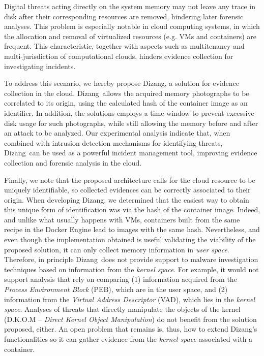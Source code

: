 \documentclass[twocolumn, notitlepage]{bmcart}%
\newcommand{\fancyname}{Dizang}
\begin{document}
Digital threats acting directly on the system memory may not leave any trace in disk after their corresponding resources are removed, hindering later forensic analyses.
%
This problem is especially notable in cloud computing systems, in which the allocation and removal of virtualized resources (e.g. VMs and containers) are frequent.
%
This characteristic, together with aspects such as multitenancy and multi-jurisdiction of computational clouds, hinders evidence collection for investigating incidents.


To address this scenario, we hereby propose \fancyname, a solution for evidence collection in the cloud.
%
\fancyname\ allows the acquired memory photographs to be correlated to its origin, using the calculated hash of the container image as an identifier.
%
In addition, the solutions employs a time window to prevent excessive disk usage for such photographs, while still allowing the memory before and after an attack to be analyzed.
%
Our experimental analysis indicate that, when combined with intrusion detection mechanisms for identifying threats, \fancyname\ can be used as a powerful incident management tool, improving evidence collection and forensic analysis in the cloud.
%


Finally, we note that the proposed architecture calls for the cloud resource to be uniquely identifiable, so collected evidences can be correctly associated to their origin.
%
When developing \fancyname, we determined that the easiest way to obtain this unique form of identification was via the hash of the container image.
%
Indeed, and unlike what usually happens with VMs, containers built from the same recipe in the Docker Engine lead to images with the same hash.
%
Nevertheless, and even though the implementation obtained is useful validating the viability of the proposed solution, it can only collect memory information in \textit{user space}.
%
Therefore, in principle \fancyname\ does not provide support to malware investigation techniques based on information from the \textit{kernel space}.
%
For example, it would not support analysis that rely on comparing (1) information acquired from the \textit{Process Environment Block} (PEB), which are in the user space, and (2) information from the \textit{Virtual Address Descriptor} (VAD), which lies in the \textit{kernel space}. 
%
Analyses of threats that directly manipulate the objects of the kernel (D.K.O.M – \textit{Direct Kernel Object Manipulation}) do not benefit from the solution proposed, either.
%
An open problem that remains is, thus, how to extend \fancyname's functionalities so it can gather evidence from the \textit{kernel space} associated with a container.
\end{document}
